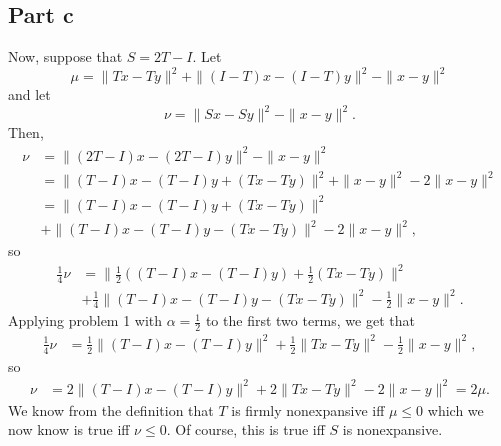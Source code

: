 \documentclass{article}
\begin{document}
\subsection{Part c}
Now, suppose that $S = 2T - I$. Let 
\[
\mu = \|Tx - Ty\|^2 + \|(I-T)x - (I-T)y\|^2 - \|x-y\|^2
\]
and let 
\[
\nu = \|Sx - Sy\|^2 - \|x-y\|^2.
\]
Then, 
\begin{align*}
\nu &= \|(2T-I)x-(2T-I)y\|^2-\|x-y\|^2 \\&=
\|(T-I)x-(T-I)y+(Tx-Ty)\|^2+\|x-y\|^2-2\|x-y\|^2\\&=
\|(T-I)x-(T-I)y+(Tx-Ty)\|^2\\&+\|(T-I)x-(T-I)y-(Tx-Ty)\|^2-2\|x-y\|^2,
\end{align*}
so
\begin{align*}
\frac{1}{4}\nu&=\|\frac{1}{2}((T-I)x-(T-I)y)+\frac{1}{2}(Tx-Ty)\|^2\\&+\frac{1}{4}\|(T-I)x-(T-I)y-(Tx-Ty)\|^2-\frac{1}{2}\|x-y\|^2.
\end{align*}
Applying problem 1 with $\alpha=\frac{1}{2}$ to the first two terms, we get that 
\begin{align*}
    \frac{1}{4}\nu&=\frac{1}{2}\|(T-I)x-(T-I)y\|^2+\frac{1}{2}\|Tx-Ty\|^2-\frac{1}{2}\|x-y\|^2,
\end{align*}
so
\begin{align*}
\nu&=2\|(T-I)x-(T-I)y\|^2+2\|Tx-Ty\|^2-2\|x-y\|^2=2\mu.
\end{align*}
We know from the definition that $T$ is firmly nonexpansive iff $\mu\leq0$ which we now know is true iff $\nu\leq0$. Of course, this is true iff $S$ is nonexpansive.
\end{document}
